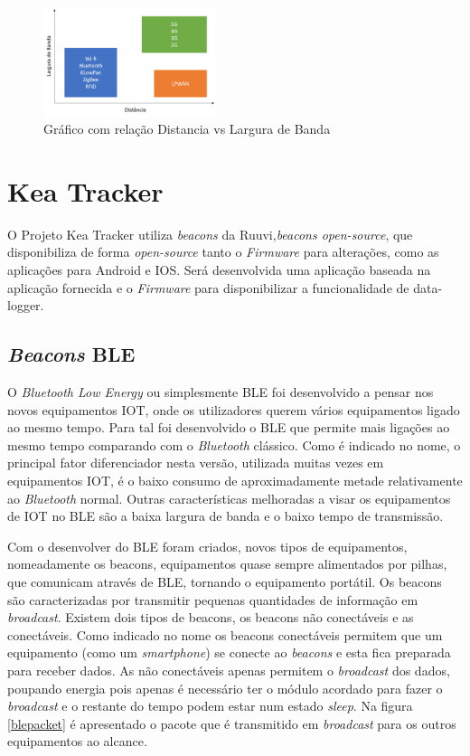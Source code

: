 \begin{figure}[ht]
\centering
\includegraphics[width=0.45\textwidth]{images/lpwan.png}
\caption{Gráfico com relação Distancia vs Largura de Banda\cite{masterthesisLPWAN}}\label{figgraphlpwan}
\end{figure}



\section {Kea Tracker}\label{kea}
O Projeto Kea Tracker utiliza \textit{beacons} da Ruuvi,\textit{beacons open-source}\cite{ruuvi}, que disponibiliza de forma \textit{open-source} tanto o \textit{Firmware} para alterações, como as aplicações para Android e IOS. Será desenvolvida uma aplicação baseada na aplicação fornecida e o \textit{Firmware} para disponibilizar a funcionalidade de data-logger.
\subsection{\textit{Beacons} BLE}
\par
O \textit{Bluetooth Low Energy} ou simplesmente BLE foi desenvolvido a pensar nos novos equipamentos IOT, onde os utilizadores querem vários equipamentos ligado ao mesmo tempo. Para tal foi desenvolvido o BLE que permite mais ligações ao mesmo tempo comparando com o \textit{Bluetooth} clássico.
Como é indicado no nome, o principal fator diferenciador nesta versão, utilizada muitas vezes em equipamentos IOT, é o baixo consumo de aproximadamente metade relativamente ao \textit{Bluetooth} normal. Outras características melhoradas a visar os equipamentos de IOT no BLE são a baixa largura de banda e o baixo tempo de transmissão.

Com o desenvolver do BLE foram criados, novos tipos de equipamentos, nomeadamente os beacons, equipamentos quase sempre alimentados por pilhas, que comunicam através de BLE, tornando o equipamento portátil. Os beacons são caracterizadas por transmitir pequenas quantidades de informação em \textit{broadcast}.
Existem dois tipos de beacons, os beacons não conectáveis e as conectáveis\cite{blepacket}. Como indicado no nome os beacons conectáveis permitem que um equipamento (como um \textit{smartphone}) se conecte ao \textit{beacons} e esta fica preparada para receber dados. As não conectáveis apenas permitem o \textit{broadcast}  dos dados, poupando energia pois apenas é necessário ter o módulo acordado para fazer o \textit{broadcast} e o restante do tempo podem estar num estado \textit{sleep}. Na figura \ref{blepacket} é apresentado o pacote que é transmitido em \textit{broadcast} para os outros equipamentos ao alcance.

